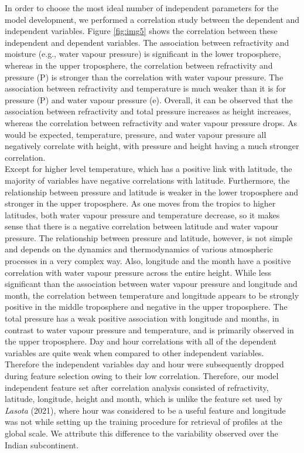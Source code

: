 \documentclass[a4paper,12pt,twoside]{article}
\begin{document}
\noindent In order to choose the most ideal number of independent parameters for the model development, we performed a correlation study between the dependent and independent variables. Figure \ref{fig:img5} shows the correlation between these independent and dependent variables. The association between refractivity and moisture (e.g., water vapour pressure) is significant in the lower troposphere, whereas in the upper troposphere, the correlation between refractivity and pressure (P) is stronger than the correlation with water vapour pressure. The association between refractivity and temperature is much weaker than it is for pressure (P) and water vapour pressure (e). Overall, it can be observed that the association between refractivity and total pressure increases as height increases, whereas the correlation between refractivity and water vapour pressure drops. As would be expected, temperature, pressure, and water vapour pressure all negatively correlate with height, with pressure and height having a much stronger correlation. \\

\noindent Except for higher level temperature, which has a positive link with latitude, the majority of variables have negative correlations with latitude. Furthermore, the relationship between pressure and latitude is weaker in the lower troposphere and stronger in the upper troposphere. As one moves from the tropics to higher latitudes, both water vapour pressure and temperature decrease, so it makes sense that there is a negative correlation between latitude and water vapour pressure. The relationship between pressure and latitude, however, is not simple and depends on the dynamics and thermodynamics of various atmospheric processes in a very complex way. Also, longitude and the month have a positive correlation with water vapour pressure across the entire height. While less significant than the association between water vapour pressure and longitude and month, the correlation between temperature and longitude appears to be strongly positive in the middle troposphere and negative in the upper troposphere.  The total pressure has a weak positive association with longitude and months, in contrast to water vapour pressure and temperature, and is primarily observed in the upper troposphere. Day and hour correlations with all of the dependent variables are quite weak when compared to other independent variables. Therefore the independent variables day and hour were subsequently dropped during feature selection owing to their low correlation. Therefore, our model independent feature set after correlation analysis consisted of refractivity, latitude, longitude, height and month, which is unlike the feature set used by \textit{Lasota} (2021), where hour was considered to be a useful feature and longitude was not while setting up the training procedure for retrieval of profiles at the global scale. We attribute this difference to the variability observed over the Indian subcontinent. \\
\end{document}
